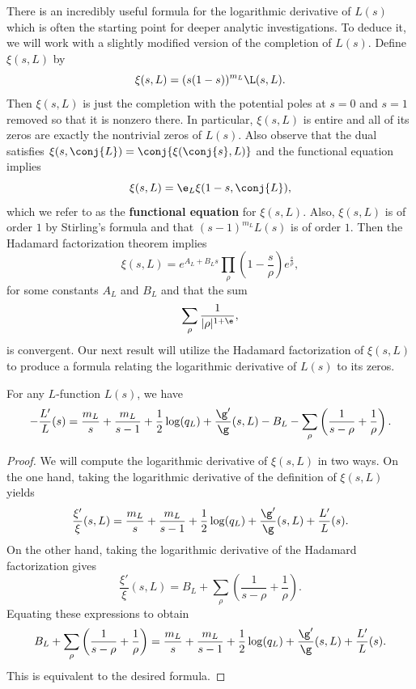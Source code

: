 \documentclass[12pt]{article}
\begin{document}
      There is an incredibly useful formula for the logarithmic derivative of \(L(s)\) which is often the starting point for deeper analytic investigations. To deduce it, we will work with a slightly modified version of the completion of \(L(s)\). Define \(\xi(s,L)\) by
      \[
        \xi(s,L) = (s(1-s))^{m_{L}}\L(s,L).
      \]
      Then \(\xi(s,L)\) is just the completion with the potential poles at \(s = 0\) and \(s = 1\) removed so that it is nonzero there. In particular, \(\xi(s,L)\) is entire and all of its zeros are exactly the nontrivial zeros of \(L(s)\). Also observe that the dual satisfies \(\xi(s,\conj{L}) = \conj{\xi(\conj{s},L)}\) and the functional equation implies
      \[
        \xi(s,L) = \e_{L}\xi(1-s,\conj{L}),
      \]
      which we refer to as the \textbf{functional equation} for \(\xi(s,L)\). Also, \(\xi(s,L)\) is of order \(1\) by Stirling's formula and that \((s-1)^{m_{L}}L(s)\) is of order \(1\). Then the Hadamard factorization theorem implies
      \[
        \xi(s,L) = e^{A_{L}+B_{L}s}\prod_{\rho}\left(1-\frac{s}{\rho}\right)e^{\frac{s}{\rho}},
      \]
      for some constants \(A_{L}\) and \(B_{L}\) and that the sum
      \begin{equation}\label{Hadamard_zero_sum_for_xi}
        \sum_{\rho}\frac{1}{|\rho|^{1+\e}},
      \end{equation}
      is convergent. Our next result will utilize the Hadamard factorization of \(\xi(s,L)\) to produce a formula relating the logarithmic derivative of \(L(s)\) to its zeros.

      \begin{proposition}\label{prop:explicit_formula_log_derivative}
        For any \(L\)-function \(L(s)\), we have
        \[
          -\frac{L'}{L}(s) = \frac{m_{L}}{s}+\frac{m_{L}}{s-1}+\frac{1}{2}\log(q_{L})+\frac{\g'}{\g}(s,L)-B_{L}-\sum_{\rho}\left(\frac{1}{s-\rho}+\frac{1}{\rho}\right).
        \]
      \end{proposition}
      \begin{proof}
        We will compute the logarithmic derivative of \(\xi(s,L)\) in two ways. On the one hand, taking the logarithmic derivative of the definition of \(\xi(s,L)\) yields
        \[
          \frac{\xi'}{\xi}(s,L) = \frac{m_{L}}{s}+\frac{m_{L}}{s-1}+\frac{1}{2}\log(q_{L})+\frac{\g'}{\g}(s,L)+\frac{L'}{L}(s).
        \]
        On the other hand, taking the logarithmic derivative of the Hadamard factorization gives
        \[
          \frac{\xi'}{\xi}(s,L) = B_{L}+\sum_{\rho}\left(\frac{1}{s-\rho}+\frac{1}{\rho}\right).
        \]
        Equating these expressions to obtain
        \[
          B_{L}+\sum_{\rho}\left(\frac{1}{s-\rho}+\frac{1}{\rho}\right) = \frac{m_{L}}{s}+\frac{m_{L}}{s-1}+\frac{1}{2}\log(q_{L})+\frac{\g'}{\g}(s,L)+\frac{L'}{L}(s).
        \]
        This is equivalent to the desired formula.
      \end{proof}
\end{document}
